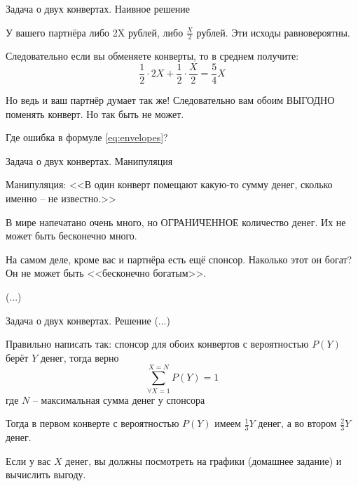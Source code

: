 \begin{frame}{Задача о двух конвертах. Наивное решение}

У вашего партнёра либо 2X рублей, либо
$\frac{X}{2}$ рублей. Эти исходы равновероятны.

Следовательно если вы обменяете конверты, то в среднем получите:
\begin{equation}\label{eq:envelopes}
	\frac{1}{2}\cdot2X + \frac{1}{2}\cdot\frac{X}{2}=\frac{5}{4}X	
\end{equation}

Но ведь и ваш партнёр думает так же! 
Следовательно вам обоим ВЫГОДНО поменять конверт.
Но так быть не может.

Где ошибка в формуле \eqref{eq:envelopes}?
\end{frame}

\begin{frame}{Задача о двух конвертах. Манипуляция}

Манипуляция: 
<<В один конверт помещают какую-то сумму денег,
сколько именно -- не известно.>>

В мире напечатано очень много, но ОГРАНИЧЕННОЕ 
количество денег.
Их не может быть бесконечно много.

На самом деле, кроме вас и партнёра есть ещё спонсор.
Наколько этот он богат?
Он не может быть <<бесконечно богатым>>.

(...)
\end{frame}

\begin{frame}{Задача о двух конвертах. Решение}
\small
(...)

Правильно написать так:
спонсор для обоих конвертов с вероятностью $P(Y)$ берёт $Y$ денег,
тогда верно
\begin{equation}
\sum_{\forall X=1}^{X=N} P(Y) = 1
\end{equation}
где $N$ -- максимальная сумма денег у спонсора	

Тогда в первом конверте с вероятностью $P(Y)$ имеем $\frac{1}{3}Y$ денег,
а во втором $\frac{2}{3}Y$ денег.


Если у вас $X$ денег,
вы должны посмотреть на графики (домашнее задание)
и вычислить выгоду.

	



\end{frame}


